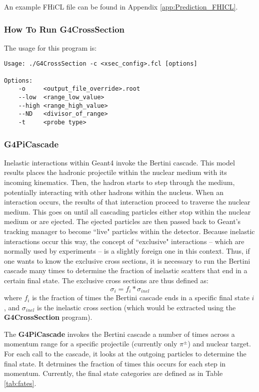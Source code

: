 \documentclass[12pt]{article}
\begin{document}
An example FHiCL file can be found in Appendix \ref{app:Prediction_FHICL}.

\subsubsection{How To Run G4CrossSection}
The usage for this program is: 

\begin{minipage}{\linewidth}
\begin{lstlisting}
Usage: ./G4CrossSection -c <xsec_config>.fcl [options]

Options: 
	-o     <output_file_override>.root
	--low  <range_low_value> 
	--high <range_high_value>
	--ND   <divisor_of_range> 
	-t     <probe type>
\end{lstlisting}
\end{minipage}


\subsubsection{G4PiCascade}
Inelastic interactions within Geant4 invoke the Bertini cascade. This model results places the hadronic projectile within the nuclear medium with its incoming kinematics. Then, the hadron starts to step through the medium, potentially interacting with other hadrons within the nucleus. When an interaction occurs, the results of that interaction proceed to traverse the nuclear medium. This goes on until all cascading particles either stop within the nuclear medium or are ejected. The ejected particles are then passed back to Geant's tracking manager to become ``live" particles within the detector. Because inelastic interactions occur this way, the concept of ``exclusive" interactions -- which are normally used by experiments -- is a slightly foreign one in this context. Thus, if one wants to know the exclusive cross sections, it is necessary to run the Bertini cascade many times to determine the fraction of inelastic scatters that end in a certain final state. The exclusive cross sections are thus defined as:
\begin{equation}
	\sigma_{i} = f_{i} * \sigma_{inel}
\end{equation}
where $f_i$ is the fraction of times the Bertini cascade ends in a specific final state $i$, and $\sigma_{inel}$ is the inelastic cross section (which would be extracted using the \textbf{G4CrossSection} program).

The \textbf{G4PiCascade} invokes the Bertini cascade a number of times across a momentum range for a specific projectile (currently only $\pi^{\pm}$) and nuclear target. For each call to the cascade, it looks at the outgoing particles to determine the final state. It detrmines the fraction of times this occurs for each step in momentum. Currently, the final state categories are defined as in Table \ref{tab:fates}.
\end{document}
